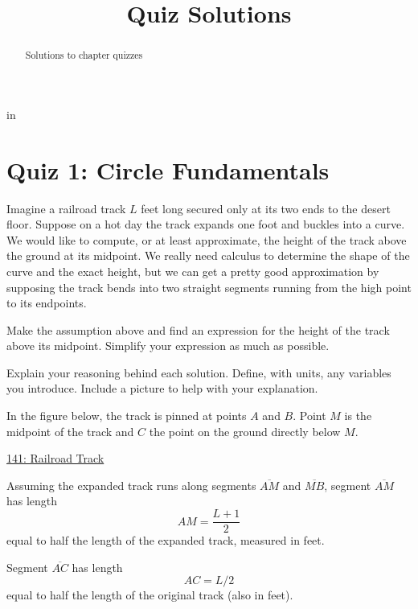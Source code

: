 \documentclass{ximera}
\title{Quiz Solutions}
\newcommand{\pskip}{\vskip 0.1 in}
\begin{document}
\begin{abstract}
Solutions to chapter quizzes
\end{abstract}
\maketitle


\pskip

\section*{Quiz 1: Circle Fundamentals}


\begin{question}  \label{Q:9444433331350}
Imagine a railroad track $L$ feet long secured only at its two ends to the desert floor. Suppose on a hot day the track expands one foot and buckles into a curve. We would like to compute, or at least approximate, the height of the track above the ground at its midpoint. We really need calculus to determine the shape of the curve and the exact height, but we can get a pretty good approximation by supposing the track bends into two straight segments running from the high point to its endpoints.

Make the assumption above and find an expression for the height of the track above its midpoint. Simplify your expression as much as possible. 

Explain your reasoning behind each solution. Define, with units, any variables you introduce. Include a picture to help with your explanation.

\begin{explanation}
In the figure below, the track is pinned at points $A$ and $B$. Point $M$ is the midpoint of the track and $C$ the point on the ground directly below $M$.

\begin{onlineOnly}
    \begin{center}
\end{center}
\end{onlineOnly}

\href{https://www.desmos.com/calculator/uio1ixkbxe}{141: Railroad Track}


Assuming the expanded track runs along segments $\overline{AM}$ and $\overline{MB}$,  segment $\overline{AM}$ has length
\[
   AM = \frac{L+1}{2}
\]
equal to half the length of the expanded track, measured in feet.

Segment $\overline{AC}$ has length
\[
  AC = L/2
\]
equal to half the length of the original track (also in feet). 


\end{explanation}
\end{question}
\end{document}
